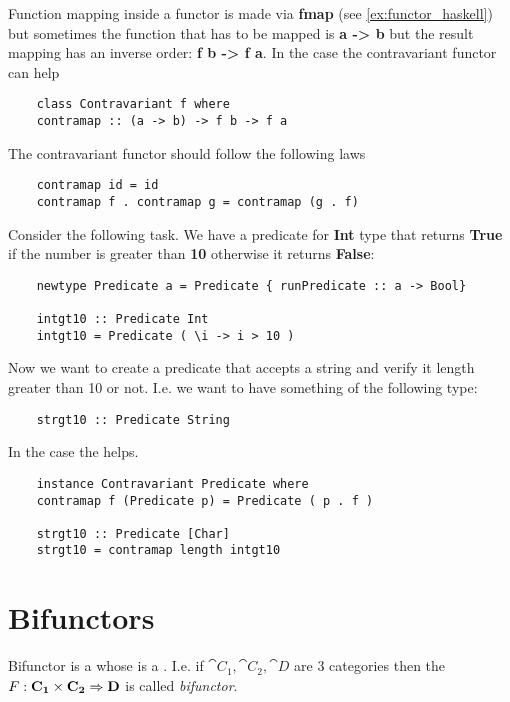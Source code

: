\begin{example}
  \label{ex:contravariant_functor_hask}
  Function mapping inside a functor is made via \textbf{fmap} (see
  \cref{ex:functor_haskell}) but sometimes the function that has to be
  mapped is \textbf{a -> b} but the result mapping has an inverse
  order: \textbf{f b -> f a}. In the case the contravariant functor
  can help
  \begin{verbatim}
    class Contravariant f where
    contramap :: (a -> b) -> f b -> f a
  \end{verbatim}

  The contravariant functor should follow the following laws
  \begin{verbatim}
    contramap id = id
    contramap f . contramap g = contramap (g . f)
  \end{verbatim}

  Consider the following task. We have a predicate for \textbf{Int}
  type that returns \textbf{True} if the number is greater than
  \textbf{10} otherwise it returns \textbf{False}:
  \begin{verbatim}
    newtype Predicate a = Predicate { runPredicate :: a -> Bool}

    intgt10 :: Predicate Int
    intgt10 = Predicate ( \i -> i > 10 )
  \end{verbatim}
  Now we want to create a predicate that accepts a string and
  verify it length greater than 10 or not.
  I.e. we want to have something of the following type:
  \begin{verbatim}
    strgt10 :: Predicate String
  \end{verbatim}
  In the case the  helps.

  \begin{verbatim}
    instance Contravariant Predicate where
    contramap f (Predicate p) = Predicate ( p . f )

    strgt10 :: Predicate [Char]
    strgt10 = contramap length intgt10
  \end{verbatim}
\end{example}


\section{Bifunctors}

\begin{definition}[Bifunctor]
  \label{def:bifunctor}
  Bifunctor is a  whose  is
  a . I.e. if $\cat{C_1}, \cat{C_2},
  \cat{D}$ are 3 categories then the  
  \(
  F: \mathbf{C_1} \times \mathbf{C_2} \Rightarrow \mathbf{D}
  \) is called \textit{bifunctor}.
\end{definition}

